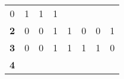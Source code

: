 \documentclass[11pt,english,landscape]{article}
\begin{document}
\begin{multicols}{3}
\begin{tabular}{| c | c | c | c | c | c | c | c |}
		\textcolor{MaterialIndigo}{0}          &                                                                                                
		\textcolor{MaterialPink}{1}            &                                                                                                
		\textcolor{MaterialPink}{1}            &                                                                                                
		\textcolor{MaterialPink}{1}
		\\
		\rowcolor{GoogleYellow!10}\bfseries{2} &                                                                                                
		\textcolor{MaterialIndigo}{0}          &                                                                                                
		\textcolor{MaterialIndigo}{0}          &                                                                                                
		\textcolor{MaterialPink}{1}            &                                                                                                
		\textcolor{MaterialPink}{1}            &                                                                                                
		\textcolor{MaterialIndigo}{0}          &                                                                                                
		\textcolor{MaterialIndigo}{0}          &                                                                                                
		\textcolor{MaterialPink}{1}
		\\
		\rowcolor{GoogleYellow!20}\bfseries{3} &                                                                                                
		\textcolor{MaterialIndigo}{0}          &                                                                                                
		\textcolor{MaterialIndigo}{0}          &                                                                                                
		\textcolor{MaterialPink}{1}            &                                                                                                
		\textcolor{MaterialPink}{1}            &                                                                                                
		\textcolor{MaterialPink}{1}            &                                                                                                
		\textcolor{MaterialPink}{1}            &                                                                                                
		\textcolor{MaterialIndigo}{0} 
		\\
		\rowcolor{GoogleYellow!10}\bfseries{4} &                                                                                                

\end{tabular}
\end{multicols}
\end{document}
